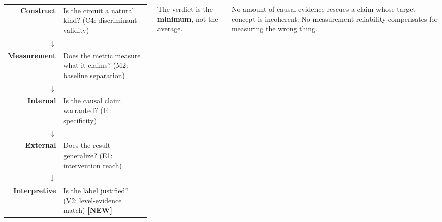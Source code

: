 \documentclass[28pt, a0paper, portrait]{tikzposter}
\begin{document}
\begin{columns}
{{  \vspace{5mm}
  \renewcommand{\arraystretch}{1.5}
  {\large
  \begin{tabular}{@{}r>{\raggedright\arraybackslash}p{0.75\linewidth}@{}}
    \textbf{Construct} & Is the circuit a natural kind?
      {\small (C4: discriminant validity)} \\
    $\downarrow$ & \\[-6mm]
    \textbf{Measurement} & Does the metric measure what
      it claims? {\small (M2: baseline separation)} \\
    $\downarrow$ & \\[-6mm]
    \textbf{Internal} & Is the causal claim warranted?
      {\small (I4: specificity)} \\
    $\downarrow$ & \\[-6mm]
    \textbf{External} & Does the result generalize?
      {\small (E1: intervention reach)} \\
    $\downarrow$ & \\[-6mm]
    \textcolor{newlabel}{\textbf{Interpretive}} &
      \textcolor{newlabel}{Is the label justified?}
      {\small \textcolor{newlabel}{(V2: level-evidence match)
      \textbf{[NEW]}}} \\
  \end{tabular}}

  \vspace{5mm}
  {\Large The verdict is the \textbf{minimum}, not the average.}

  \vspace{3mm}
  No amount of causal evidence rescues a claim whose target
  concept is incoherent. No measurement reliability
  compensates for measuring the wrong thing.
}
}


\end{columns}
\end{document}
